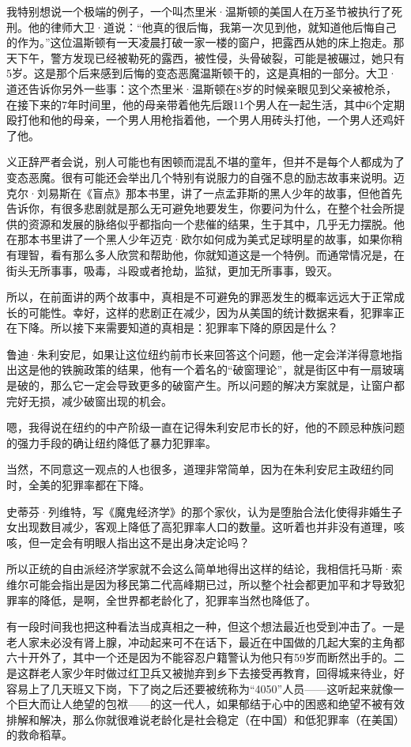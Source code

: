 我特别想说一个极端的例子，一个叫杰里米·温斯顿的美国人在万圣节被执行了死刑。他的律师大卫·道说：``他真的很后悔，我第一次见到他，就知道他后悔自己的作为。''这位温斯顿有一天凌晨打破一家一楼的窗户，把露西从她的床上抱走。那天下午，警方发现已经被勒死的露西，被性侵，头骨破裂，可能是被碾过，她只有5岁。这是那个后来感到后悔的变态恶魔温斯顿干的，这是真相的一部分。大卫·道还告诉你另外一些事：这个杰里米·温斯顿在8岁的时候亲眼见到父亲被枪杀，在接下来的7年时间里，他的母亲带着他先后跟11个男人在一起生活，其中6个定期殴打他和他的母亲，一个男人用枪指着他，一个男人用砖头打他，一个男人还鸡奸了他。

义正辞严者会说，别人可能也有困顿而混乱不堪的童年，但并不是每个人都成为了变态恶魔。很有可能还会举出几个特别有说服力的自强不息的励志故事来说明。迈克尔·刘易斯在《盲点》那本书里，讲了一点孟菲斯的黑人少年的故事，但他首先告诉你，有很多悲剧就是那么无可避免地要发生，你要问为什么，在整个社会所提供的资源和发展的脉络似乎都指向一个悲催的结果，生于其中，几乎无力摆脱。他在那本书里讲了一个黑人少年迈克·欧尔如何成为美式足球明星的故事，如果你稍有理智，看有那么多人欣赏和帮助他，你就知道这是一个特例。而通常情况是，在街头无所事事，吸毒，斗殴或者抢劫，监狱，更加无所事事，毁灭。

所以，在前面讲的两个故事中，真相是不可避免的罪恶发生的概率远远大于正常成长的可能性。幸好，这样的悲剧正在减少，因为从美国的统计数据来看，犯罪率正在下降。所以接下来需要知道的真相是：犯罪率下降的原因是什么？

鲁迪·朱利安尼，如果让这位纽约前市长来回答这个问题，他一定会洋洋得意地指出这是他的铁腕政策的结果，他有一个着名的``破窗理论''，就是街区中有一扇玻璃是破的，那么它一定会导致更多的破窗产生。所以问题的解决方案就是，让窗户都完好无损，减少破窗出现的机会。

嗯，我得说在纽约的中产阶级一直在记得朱利安尼市长的好，他的不顾忌种族问题的强力手段的确让纽约降低了暴力犯罪率。

当然，不同意这一观点的人也很多，道理非常简单，因为在朱利安尼主政纽约同时，全美的犯罪率都在下降。

史蒂芬·列维特，写《魔鬼经济学》的那个家伙，认为是堕胎合法化使得非婚生子女出现数目减少，客观上降低了高犯罪率人口的数量。这听着也并非没有道理，咳咳，但一定会有明眼人指出这不是出身决定论吗？

所以正统的自由派经济学家就不会这么简单地得出这样的结论，我相信托马斯·索维尔可能会指出是因为移民第二代高峰期已过，所以整个社会都更加平和才导致犯罪率的降低，是啊，全世界都老龄化了，犯罪率当然也降低了。

有一段时间我也把这种看法当成真相之一种，但这个想法最近也受到冲击了。一是老人家未必没有肾上腺，冲动起来可不在话下，最近在中国做的几起大案的主角都六十开外了，其中一个还是因为不能容忍户籍警认为他只有59岁而断然出手的。二是这群老人家少年时做过红卫兵又被抛弃到乡下去接受再教育，回得城来待业，好容易上了几天班又下岗，下了岗之后还要被统称为``4050''人员------这听起来就像一个巨大而让人绝望的包袱------的这一代人，如果郁结于心中的困惑和绝望不被有效排解和解决，那么你就很难说老龄化是社会稳定（在中国）和低犯罪率（在美国）的救命稻草。


